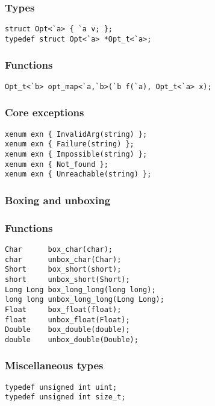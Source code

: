 \subsubsection*{Types}
\begin{verbatim}
struct Opt<`a> { `a v; };
typedef struct Opt<`a> *Opt_t<`a>;
\end{verbatim}

\subsubsection*{Functions}
\begin{verbatim}
Opt_t<`b> opt_map<`a,`b>(`b f(`a), Opt_t<`a> x);
\end{verbatim}

\subsubsection*{Core exceptions}
\begin{verbatim}
xenum exn { InvalidArg(string) };
xenum exn { Failure(string) };
xenum exn { Impossible(string) };
xenum exn { Not_found };
xenum exn { Unreachable(string) };
\end{verbatim}

\subsubsection*{Boxing and unboxing}
\subsubsection*{Functions}
\begin{verbatim}
Char      box_char(char);
char      unbox_char(Char);
Short     box_short(short);
short     unbox_short(Short);
Long Long box_long_long(long long);
long long unbox_long_long(Long Long);
Float     box_float(float);
float     unbox_float(Float);
Double    box_double(double);
double    unbox_double(Double);
\end{verbatim}

\subsubsection*{Miscellaneous types}
\begin{verbatim}
typedef unsigned int uint;
typedef unsigned int size_t;
\end{verbatim}

